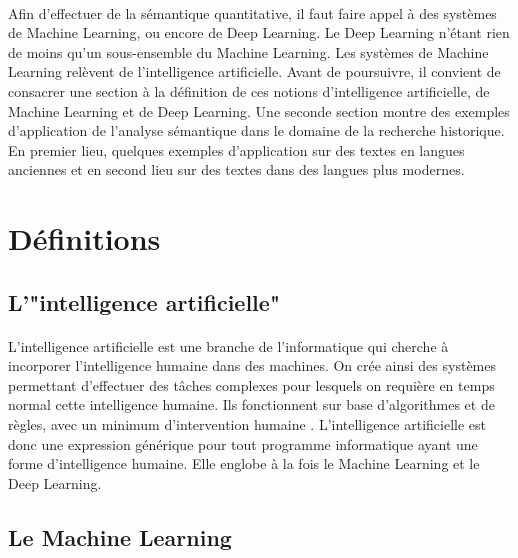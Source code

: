 \documentclass{article}
\begin{document}
\paragraph{}
Afin d’effectuer de la sémantique quantitative, il faut faire appel à des systèmes de Machine Learning, ou encore de Deep Learning. Le Deep Learning n'étant rien de moins qu’un sous-ensemble du Machine Learning. Les systèmes de Machine Learning relèvent de l’intelligence artificielle. Avant de poursuivre, il convient de consacrer une section à la définition de ces notions d’intelligence artificielle, de Machine Learning et de Deep Learning. Une seconde section montre des exemples d’application de l’analyse sémantique dans le domaine de la recherche historique. En premier lieu, quelques exemples d’application sur des textes en langues anciennes et en second lieu sur des textes dans des langues plus modernes. 
\section{Définitions}
\subsection{L'"intelligence artificielle"}
\paragraph{}
L’intelligence artificielle est une branche de l’informatique qui cherche à incorporer l’intelligence humaine dans des machines. On crée ainsi des systèmes permettant d’effectuer des tâches complexes pour lesquels on requière en temps normal cette intelligence humaine. Ils fonctionnent sur base d’algorithmes et de règles, avec un minimum d’intervention humaine \cite{janiesch2021machine, jakhar2020artificial}. L’intelligence artificielle est donc une expression générique pour tout programme informatique ayant une forme d’intelligence humaine. Elle englobe à la fois le Machine Learning et le Deep Learning\cite{jakhar2020artificial}. 
\subsection{Le Machine Learning}
\end{document}
